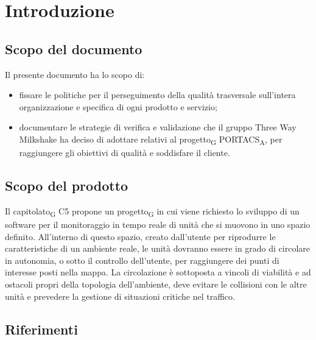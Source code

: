 \section{Introduzione}
\subsection{Scopo del documento}
    Il presente documento ha lo scopo di:
    \begin{itemize}
        \item fissare le politiche per il perseguimento della qualità trasversale sull'intera organizzazione e specifica di ogni prodotto e servizio;
        \item documentare le strategie di verifica e validazione che il gruppo Three Way Milkshake ha deciso di adottare relativi al progetto\textsubscript{G} PORTACS\textsubscript{A}, per raggiungere gli obiettivi di qualità e soddisfare il cliente.
    \end{itemize}


\subsection{Scopo del prodotto}
    
    Il capitolato\textsubscript{G} C5 propone un progetto\textsubscript{G} in cui viene richiesto lo sviluppo di un software per il monitoraggio in tempo reale di unità che si muovono in uno spazio definito. All'interno di questo spazio, creato dall'utente per riprodurre le caratteristiche di un ambiente reale, le unità dovranno essere in grado di circolare in autonomia, o sotto il controllo dell'utente, per raggiungere dei punti di interesse posti nella mappa.  La circolazione è sottoposta a vincoli di viabilità e ad ostacoli propri della topologia dell'ambiente, deve evitare le collisioni con le altre unità e prevedere la gestione di situazioni critiche nel traffico.

\subsection{Riferimenti}
\label{ref}
